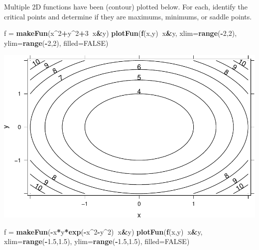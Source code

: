 \documentclass[
]{book}
\newenvironment{Shaded}{\begin{snugshade}}{\end{snugshade}}
\newcommand{\DataTypeTok}[1]{\textcolor[rgb]{0.13,0.29,0.53}{#1}}
\newcommand{\DecValTok}[1]{\textcolor[rgb]{0.00,0.00,0.81}{#1}}
\newcommand{\FloatTok}[1]{\textcolor[rgb]{0.00,0.00,0.81}{#1}}
\newcommand{\KeywordTok}[1]{\textcolor[rgb]{0.13,0.29,0.53}{\textbf{#1}}}
\newcommand{\NormalTok}[1]{#1}
\newcommand{\OperatorTok}[1]{\textcolor[rgb]{0.81,0.36,0.00}{\textbf{#1}}}
\newcommand{\OtherTok}[1]{\textcolor[rgb]{0.56,0.35,0.01}{#1}}
\newcommand{\StringTok}[1]{\textcolor[rgb]{0.31,0.60,0.02}{#1}}
\begin{document}
Multiple 2D functions have been (contour) plotted below. For each, identify the critical points and determine if they are maximums, minimums, or saddle points.

\begin{Shaded}
\begin{Highlighting}[]
\NormalTok{f =}\StringTok{ }\KeywordTok{makeFun}\NormalTok{(x}\OperatorTok{^}\DecValTok{2}\OperatorTok{+}\NormalTok{y}\OperatorTok{^}\DecValTok{2}\OperatorTok{+}\DecValTok{3}\OperatorTok{~}\NormalTok{x}\OperatorTok{&}\NormalTok{y)}
\KeywordTok{plotFun}\NormalTok{(}\KeywordTok{f}\NormalTok{(x,y)}\OperatorTok{~}\NormalTok{x}\OperatorTok{&}\NormalTok{y, }\DataTypeTok{xlim=}\KeywordTok{range}\NormalTok{(}\OperatorTok{-}\DecValTok{2}\NormalTok{,}\DecValTok{2}\NormalTok{), }\DataTypeTok{ylim=}\KeywordTok{range}\NormalTok{(}\OperatorTok{-}\DecValTok{2}\NormalTok{,}\DecValTok{2}\NormalTok{), }\DataTypeTok{filled=}\OtherTok{FALSE}\NormalTok{)}
\end{Highlighting}
\end{Shaded}

\begin{center}\includegraphics{_bookdown_files/math135_handbook_files/figure-latex/unnamed-chunk-94-1} \end{center}

\begin{Shaded}
\begin{Highlighting}[]
\NormalTok{f =}\StringTok{ }\KeywordTok{makeFun}\NormalTok{(}\OperatorTok{-}\NormalTok{x}\OperatorTok{*}\NormalTok{y}\OperatorTok{*}\KeywordTok{exp}\NormalTok{(}\OperatorTok{-}\NormalTok{x}\OperatorTok{^}\DecValTok{2}\OperatorTok{-}\NormalTok{y}\OperatorTok{^}\DecValTok{2}\NormalTok{)}\OperatorTok{~}\NormalTok{x}\OperatorTok{&}\NormalTok{y)}
\KeywordTok{plotFun}\NormalTok{(}\KeywordTok{f}\NormalTok{(x,y)}\OperatorTok{~}\NormalTok{x}\OperatorTok{&}\NormalTok{y, }\DataTypeTok{xlim=}\KeywordTok{range}\NormalTok{(}\OperatorTok{-}\FloatTok{1.5}\NormalTok{,}\FloatTok{1.5}\NormalTok{), }\DataTypeTok{ylim=}\KeywordTok{range}\NormalTok{(}\OperatorTok{-}\FloatTok{1.5}\NormalTok{,}\FloatTok{1.5}\NormalTok{), }\DataTypeTok{filled=}\OtherTok{FALSE}\NormalTok{)}
\end{Highlighting}
\end{Shaded}
\end{document}
